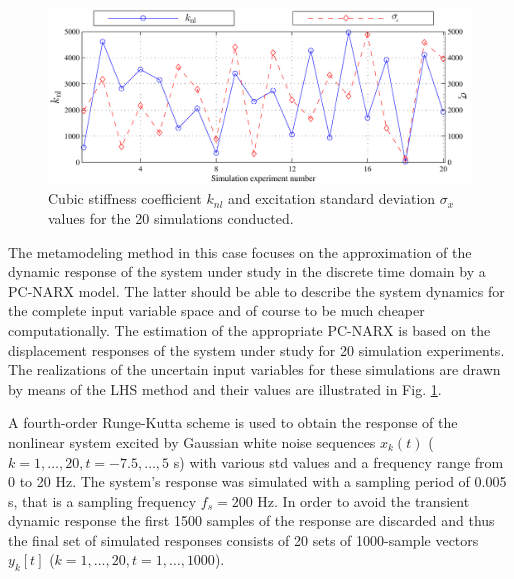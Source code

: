 \documentclass[preprint,3p,review,times,11pt]{elsarticle}
\begin{document}
\begin{figure}[t!]
\begin{center}
\includegraphics[width = 1\textwidth]{figs/cubic_uncprops.pdf}
\caption{Cubic stiffness coefficient $k_{nl}$ and excitation standard deviation $\sigma_x$ values for the 20 simulations conducted. \label{fig:cubic_uncprops}}
\end{center}
\end{figure}


The metamodeling method in this case focuses on the approximation of the dynamic response of the system under study in the discrete time domain by a PC-NARX model. The latter should be able to describe the system dynamics for the complete input variable space and of course to be much cheaper computationally. The estimation of the appropriate PC-NARX is based on the displacement responses of the system under study for 20 simulation experiments. The realizations of the uncertain input variables for these simulations are drawn by means of the LHS method and their values are illustrated in Fig. \ref{fig:cubic_uncprops}.     


A fourth-order Runge-Kutta scheme is used to obtain the response of the nonlinear system excited by Gaussian white noise sequences $x_k(t)$ ($k = 1, \ldots, 20, t = -7.5, \ldots, 5 $ s) with various std values and a frequency range from 0 to 20 Hz. The system's response was simulated with a sampling period of 0.005 s, that is a sampling frequency $f_s = 200$ Hz. In order to avoid the transient dynamic response the first 1500 samples of the response are discarded and thus the final set of simulated responses consists of 20 sets of 1000-sample vectors $y_k[t]$ ($k = 1, \ldots, 20, t = 1, \ldots, 1000 $).
\end{document}
